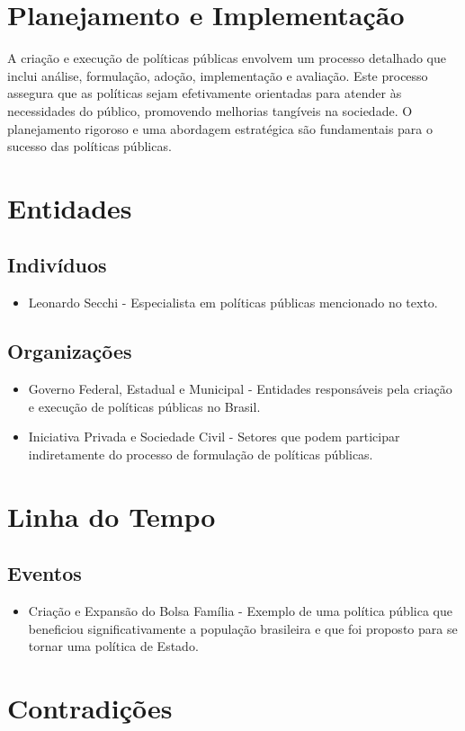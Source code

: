 \documentclass[
   article,       
   12pt,          
   oneside,       
   a4paper,       
   english,       
   brazil,        
   sumario=tradicional
   ]{abntex2}
\begin{document}
\section{Planejamento e Implementação}
A criação e execução de políticas públicas envolvem um processo detalhado que inclui análise, formulação, adoção, implementação e avaliação. Este processo assegura que as políticas sejam efetivamente orientadas para atender às necessidades do público, promovendo melhorias tangíveis na sociedade. O planejamento rigoroso e uma abordagem estratégica são fundamentais para o sucesso das políticas públicas.
\section{Entidades}
\subsection{Indivíduos}
\begin{itemize}
    \item Leonardo Secchi - Especialista em políticas públicas mencionado no texto.
\end{itemize}
\subsection{Organizações}
\begin{itemize}
    \item Governo Federal, Estadual e Municipal - Entidades responsáveis pela criação e execução de políticas públicas no Brasil.
    \item Iniciativa Privada e Sociedade Civil - Setores que podem participar indiretamente do processo de formulação de políticas públicas.
\end{itemize}
\section{Linha do Tempo}
\subsection{Eventos}
\begin{itemize}
    \item Criação e Expansão do Bolsa Família - Exemplo de uma política pública que beneficiou significativamente a população brasileira e que foi proposto para se tornar uma política de Estado.
\end{itemize}
\section{Contradições}
\end{document}
